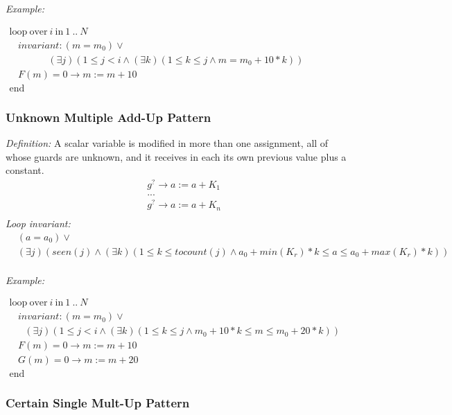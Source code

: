 \documentclass[a4paper,10pt]{article}
\newcommand{\KWloop}{\ensuremath{\mathrm{loop}~}}
\newcommand{\KWend}{\ensuremath{\mathrm{end}~}}
\newcommand{\KWover}{\ensuremath{\mathrm{over}~}}
\newcommand{\KWin}{\ensuremath{~\mathrm{in}~}}
\newcommand{\seen}[1]{\ensuremath{\mathit{seen}(#1)}\xspace}
\newcommand{\tocount}[1]{\ensuremath{\mathit{tocount}(#1)}\xspace}
\newcommand{\loopinvariant}{\noindent\textit{Loop invariant:}\xspace}
\newcommand{\patterndef}{\noindent\textit{Definition:}\xspace}
\newcommand{\patternexample}{\noindent\textit{Example:}\xspace}
\begin{document}
\bigskip
\patternexample

\medskip
$\begin{array}{l}
  \KWloop \KWover i \KWin 1~..~N \\
  ~~~~ \textit{invariant}: (m = m_0) \lor \\
  ~~~~~~~~~~~~~~~~~~ (\exists j)(1 \leq j < i \land (\exists k)(1 \leq k \leq j \land m = m_0+10*k))\\
  ~~~~ F(m)=0 \rightarrow m := m+10\\
  \KWend
\end{array}$

\subsubsection*{Unknown Multiple Add-Up Pattern}

\patterndef A scalar variable is modified in more than one assignment, all of
whose guards are unknown, and it receives in each its own previous value
plus a constant.
%
\begin{eqnarray*}
&g^? \rightarrow a := a + K_1\\
&...\\
&g^? \rightarrow a := a + K_n\\
\end{eqnarray*}
%
\loopinvariant
%
\begin{eqnarray*}
&(a = a_0) \lor\\
&(\exists j)(\seen{j} \land (\exists k)(1 \leq k \leq \tocount{j} \land a_0 + \mathit{min}(K_r)*k \leq a \leq a_0 + \mathit{max}(K_r)*k))\\
\end{eqnarray*}

\bigskip
\patternexample

\medskip
$\begin{array}{l}
  \KWloop \KWover i \KWin 1~..~N \\
  ~~~~ \textit{invariant}: (m = m_0) \lor \\
  ~~~~~~~ (\exists j)(1 \leq j < i \land (\exists k)(1 \leq k \leq j \land m_0+10*k \leq m \leq m_0 +20*k))\\
  ~~~~ F(m)=0 \rightarrow m := m+10\\
  ~~~~ G(m)=0 \rightarrow m := m+20\\
  \KWend
\end{array}$

\subsubsection*{Certain Single Mult-Up Pattern}
\end{document}
